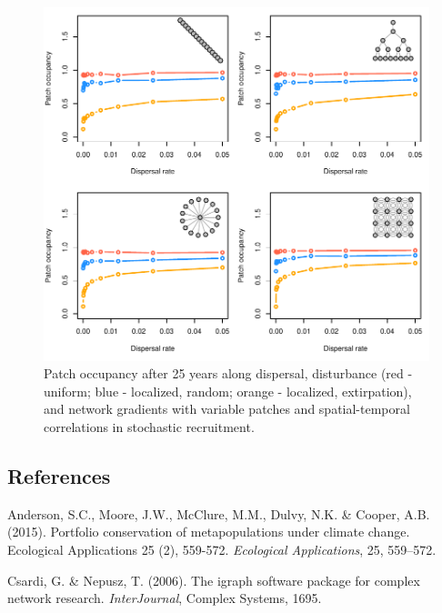 \documentclass[
]{article}
\begin{document}
\begin{figure}[H]

{\centering \includegraphics{Managing_for_ecological_surprises_in_metapopulations_files/figure-latex/patch occupancy with variable patches and space-time stochasticity-1} 

}

\caption{Patch occupancy after 25 years along dispersal, disturbance (red - uniform; blue - localized, random; orange - localized, extirpation), and network gradients with variable patches and spatial-temporal correlations in stochastic recruitment.}\label{fig:patch occupancy with variable patches and space-time stochasticity}
\end{figure}
\newpage

\hypertarget{references}{%
\subsection*{References}\label{references}}

\hypertarget{refs}{}
\leavevmode\hypertarget{ref-Anderson2015}{}%
Anderson, S.C., Moore, J.W., McClure, M.M., Dulvy, N.K. \& Cooper, A.B.
(2015). Portfolio conservation of metapopulations under climate change.
Ecological Applications 25 (2), 559-572. \emph{Ecological Applications},
25, 559--572.

\leavevmode\hypertarget{ref-igraph2006}{}%
Csardi, G. \& Nepusz, T. (2006). The igraph software package for complex
network research. \emph{InterJournal}, Complex Systems, 1695.
\end{document}
